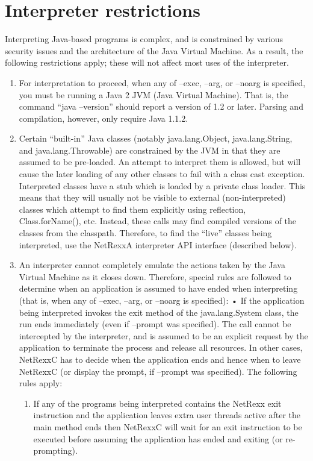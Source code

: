 \section{Interpreter restrictions} 
Interpreting Java-based programs is complex, and is constrained by various security issues and the architecture of the Java Virtual Machine. As a result, the following restrictions apply; these will not affect most uses of the interpreter. 
\begin{enumerate}
\item For interpretation to proceed, when any of –exec, –arg, or –noarg is specified, you must be running a Java 2 JVM (Java Virtual Machine). That is, the command “java –version” should report a version of 1.2 or later. Parsing and compilation, however, only require Java 1.1.2. 
\item Certain “built-in” Java classes (notably java.lang.Object, java.lang.String, and java.lang.Throwable) are constrained by the JVM in that they are assumed to be pre-loaded. An attempt to interpret them is allowed, but will cause the later loading of any other classes to fail with a class cast exception. 
Interpreted classes have a stub which is loaded by a private class loader. This means that they will usually not be visible to external (non-interpreted) classes which attempt to find them explicitly using reflection, Class.forName(), etc. Instead, these calls may find compiled versions of the classes from the classpath. Therefore, to find the “live” classes being interpreted, use the NetRexxA interpreter API interface (described below). 
\item An interpreter cannot completely emulate the actions taken by the Java Virtual Machine as it closes down. Therefore, special rules are followed to determine when an application is assumed to have ended when interpreting (that is, when any of –exec, –arg, or –noarg is specified): 
• If the application being interpreted invokes the exit method of the java.lang.System class, the run ends immediately (even if –prompt was specified). The call cannot be intercepted by the interpreter, and is assumed to be an explicit request by the application to terminate the process and release all resources. 
In other cases, NetRexxC has to decide when the application ends and hence when to leave NetRexxC (or display the prompt, if –prompt was specified). The following rules apply:
\begin{enumerate} 
\item If any of the programs being interpreted contains the NetRexx exit instruction and the application leaves extra user threads active after the main method ends then NetRexxC will wait for an exit instruction to be executed before assuming the application has ended and exiting (or re-prompting). 

\end{enumerate}
\end{enumerate}

